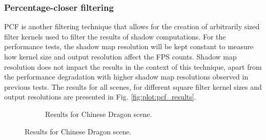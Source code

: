 \subsubsection{Percentage-closer filtering}
PCF is another filtering technique that allows for the creation of arbitrarily sized filter kernels used to filter the results of shadow computations. For the performance tests, the shadow map resolution will be kept constant to measure how kernel size and output resolution affect the FPS counts. Shadow map resolution does not impact the results in the context of this technique, apart from the performance degradation with higher shadow map resolutions observed in previous tests. The results for all scenes, for different square filter kernel sizes and output resolutions are presented in Fig. \ref{fig:plot:pcf_results}.
\begin{figure}[h]
    \centering
    \begin{subfigure}[t]{0.48\textwidth}
        \caption{Results for Chinese Dragon scene.}

\end{subfigure}
\end{figure}
